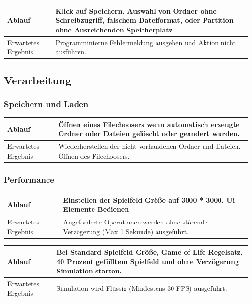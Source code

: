 \documentclass[11pt,a4paper]{article}
\begin{document}
\begin{longtable}[m]{|m{3cm}|m{10cm}|}
\hline
Ablauf&Klick auf Speichern. Auswahl von Ordner ohne Schreibzugriff, falschem Dateiformat, oder Partition ohne Ausreichenden Speicherplatz.\\
\hline
Erwartetes Ergebnis&Programminterne Fehlermeldung ausgeben und Aktion nicht ausführen.\\
\hline
\end{longtable}

 
\subsection{Verarbeitung}




\subsubsection{Speichern und Laden}

\begin{longtable}[m]{|m{3cm}|m{10cm}|}
\hline
Ablauf&Öffnen eines Filechoosers wenn automatisch erzeugte Ordner oder Dateien gelöscht oder geandert wurden.\\
\hline
Erwartetes Ergebnis&Wiederherstellen der nicht vorhandenen Ordner und Dateien. Öffnen des Filechoosers.\\
\hline
\end{longtable}

\subsubsection{Performance}
\begin{longtable}[m]{|m{3cm}|m{10cm}|}
\hline
Ablauf&Einstellen der Spielfeld Größe auf 3000 * 3000. Ui Elemente Bedienen\\
\hline
Erwartetes Ergebnis&Angeforderte Operationen werden ohne störende Verzögerung (Max 1 Sekunde) ausgeführt.\\
\hline
\end{longtable}

\begin{longtable}[m]{|m{3cm}|m{10cm}|}
\hline
Ablauf&Bei Standard Spielfeld Größe, Game of Life Regelsatz, 40 Prozent gefülltem Spielfeld und ohne Verzögerung Simulation starten.\\
\hline
Erwartetes Ergebnis&Simulation wird Flüssig (Mindestens 30 FPS) ausgeführt.\\
\hline
\end{longtable}
\end{document}
